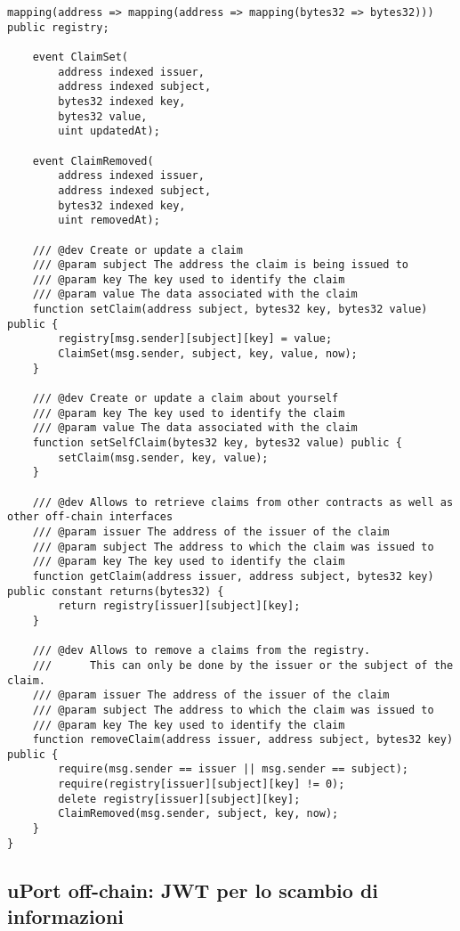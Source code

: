 \begin{itemize}
\begin{lstlisting}[language=Solidity, numbers=none]
    mapping(address => mapping(address => mapping(bytes32 => bytes32))) public registry;

    event ClaimSet(
        address indexed issuer,
        address indexed subject,
        bytes32 indexed key,
        bytes32 value,
        uint updatedAt);

    event ClaimRemoved(
        address indexed issuer,
        address indexed subject,
        bytes32 indexed key,
        uint removedAt);

    /// @dev Create or update a claim
    /// @param subject The address the claim is being issued to
    /// @param key The key used to identify the claim
    /// @param value The data associated with the claim
    function setClaim(address subject, bytes32 key, bytes32 value) public {
        registry[msg.sender][subject][key] = value;
        ClaimSet(msg.sender, subject, key, value, now);
    }

    /// @dev Create or update a claim about yourself
    /// @param key The key used to identify the claim
    /// @param value The data associated with the claim
    function setSelfClaim(bytes32 key, bytes32 value) public {
        setClaim(msg.sender, key, value);
    }

    /// @dev Allows to retrieve claims from other contracts as well as other off-chain interfaces
    /// @param issuer The address of the issuer of the claim
    /// @param subject The address to which the claim was issued to
    /// @param key The key used to identify the claim
    function getClaim(address issuer, address subject, bytes32 key) public constant returns(bytes32) {
        return registry[issuer][subject][key];
    }

    /// @dev Allows to remove a claims from the registry.
    ///      This can only be done by the issuer or the subject of the claim.
    /// @param issuer The address of the issuer of the claim
    /// @param subject The address to which the claim was issued to
    /// @param key The key used to identify the claim
    function removeClaim(address issuer, address subject, bytes32 key) public {
        require(msg.sender == issuer || msg.sender == subject);
        require(registry[issuer][subject][key] != 0);
        delete registry[issuer][subject][key];
        ClaimRemoved(msg.sender, subject, key, now);
    }
}
  \end{lstlisting}
\end{itemize}

\subsection{uPort off-chain: JWT per lo scambio di informazioni}

